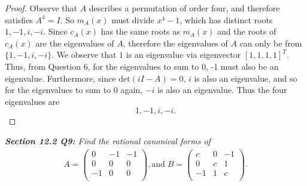 \documentclass{article}
\begin{document}
  \begin{proof}
    Observe that $A$ describes a permutation of order four, and therefore
    satisfies $A^4=I$. So $m_A(x)$ must divide $x^4-1$, which has distinct
    roots $1,-1,i,-i$. Since $c_A(x)$ has the same roots as $m_A(x)$ and
    the roots of $c_A(x)$ are the eigenvalues of $A$, therefore the
    eigenvalues of $A$ can only be from $\{1,-1,i,-i\}$. We observe that
    $1$ is an eigenvalue via eigenvector $[1,1,1,1]^T$. Thus, from
    Question 6, for the eigenvalues to sum to 0, -1 must also be an
    eigenvalue. Furthermore, since $\text{det}(iI-A)=0$, $i$ is also an
    eigenvalue, and so for the eigenvalues to sum to 0 again, $-i$ is also
    an eigenvalue. Thus the four eigenvalues are \[1,-1,i,-i.\]
  \end{proof}

\it \textbf{Section 12.2 Q9:} Find the rational canonical forms of
  \begin{align*}
    A=\begin{pmatrix}
      0&-1&-1\\
      0&0&0\\
      -1&0&0\\
    \end{pmatrix}, \text{and}\;
    B=\begin{pmatrix}
      c&0&-1\\
      0&c&1\\
      -1&1&c\\
    \end{pmatrix}.
  \end{align*}
\end{document}
